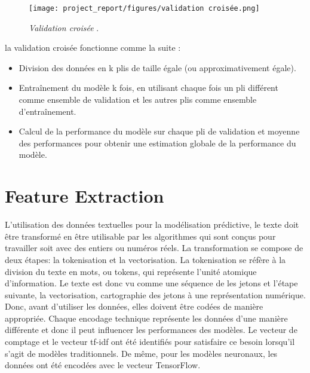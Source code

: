 \begin{figure}[h]
    \centering
    \texttt{[image: project\_report/figures/validation croisée.png]} 
    \caption{\textit{Validation croisée} \cite{towardsdatascience_cross_validation}.}
        \label{fig:figureVC}
 
\end{figure}
la validation croisée fonctionne comme la suite :

\begin{itemize}
    \item Division des données en k plis de taille égale (ou approximativement égale).
    \item Entraînement du modèle k fois, en utilisant chaque fois un pli différent comme ensemble de validation et les autres plis comme ensemble d'entraînement.
    \item Calcul de la performance du modèle sur chaque pli de validation et moyenne des performances pour obtenir une estimation globale de la performance du modèle.
\end{itemize}


\section{Feature Extraction}

L'utilisation des données textuelles pour la modélisation prédictive, le texte doit être transformé en être utilisable par les algorithmes qui sont conçus pour travailler soit avec des entiers ou numéros réels. La transformation se compose de deux étapes: la tokenisation et la vectorisation.
La tokenisation se réfère à la division du texte en mots, ou tokens, qui représente l'unité atomique d'information. Le texte est donc vu comme une séquence de les jetons et l'étape suivante, la vectorisation, cartographie des jetons à une représentation numérique. Donc, avant d'utiliser les données, elles doivent être codées de manière appropriée. Chaque encodage
technique représente les données d'une manière différente et donc il peut influencer les performances des modèles. Le vecteur de comptage et le vecteur tf-idf ont été identifiés pour satisfaire ce besoin lorsqu'il s'agit de modèles traditionnels. De même, pour les modèles neuronaux, les données ont été encodées avec le vecteur TensorFlow.



